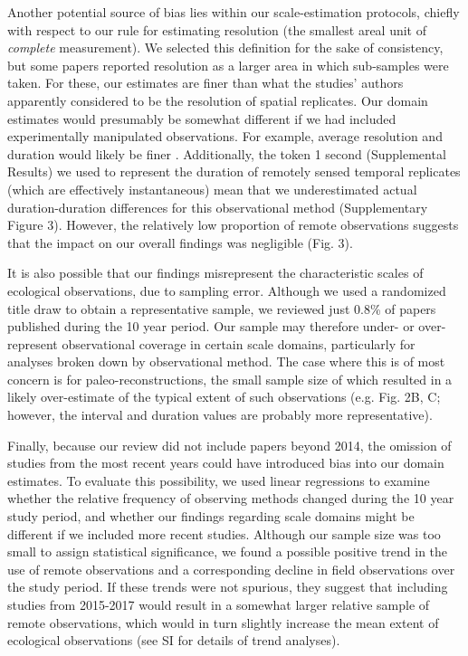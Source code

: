 \documentclass[12pt]{article}
\begin{document}
Another potential source of bias lies within our scale-estimation protocols, chiefly with respect to our rule for estimating resolution (the smallest areal unit of \emph{complete} measurement). We selected this definition for the sake of consistency, but some papers reported resolution as a larger area in which sub-samples were taken. For these, our estimates are finer than what the studies' authors apparently considered to be the resolution of spatial replicates. Our domain estimates would presumably be somewhat different if we had included experimentally manipulated observations. For example, average resolution and duration would likely be finer \cite{tilman_ecological_1989,kareiva_spatial_1988}. Additionally, the token 1 second (Supplemental Results) we used to represent the duration of remotely sensed temporal replicates (which are effectively instantaneous) mean that we underestimated actual duration-duration differences for this observational method (Supplementary Figure 3). However, the relatively low proportion of remote observations suggests that the impact on our overall findings was negligible (Fig. 3).  

It is also possible that our findings misrepresent the characteristic scales of ecological observations, due to sampling error. Although we used a randomized title draw to obtain a representative sample, we reviewed just 0.8\% of papers published during the 10 year period. Our sample may therefore under- or over-represent observational coverage in certain scale domains, particularly for analyses broken down by observational method. The case where this is of most concern is for paleo-reconstructions, the small sample size of which resulted in a likely over-estimate of the typical extent of such observations (e.g. Fig. 2B, C; however, the interval and duration values are probably more representative).     

Finally, because our review did not include papers beyond 2014, the omission of studies from the most recent years could have introduced bias into our domain estimates. To evaluate this possibility, we used linear regressions to examine whether the relative frequency of observing methods changed during the 10 year study period, and whether our findings regarding scale domains might be different if we included more recent studies. Although our sample size was too small to assign statistical significance, we found a possible positive trend in the use of remote observations and a corresponding decline in field observations over the study period. If these trends were not spurious, they suggest that including studies from 2015-2017 would result in a somewhat larger relative sample of remote observations, which would in turn slightly increase the mean extent of ecological observations (see SI for details of trend analyses).   
\end{document}
